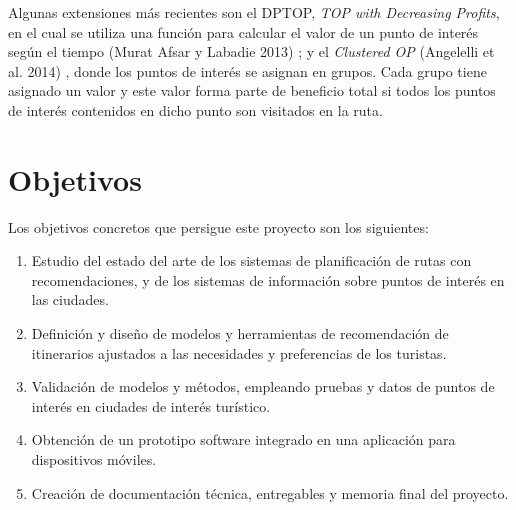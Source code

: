 Algunas extensiones más recientes son el DPTOP, \textit{TOP with Decreasing Profits}, en el cual se utiliza una función para calcular el valor de un punto de interés según el tiempo (Murat Afsar y Labadie 2013) \cite{dptop}; y el \textit{Clustered OP} (Angelelli et al. 2014) \cite{clustered_op}, donde los puntos de interés se asignan en grupos. Cada grupo tiene asignado un valor y este valor forma parte de beneficio total si todos los puntos de interés contenidos en dicho punto son visitados en la ruta.
\section[Objetivos]{Objetivos}
Los objetivos concretos que persigue este proyecto son los siguientes:
\begin{enumerate}
	\item Estudio del estado del arte de los sistemas de planificación de rutas con recomendaciones, y de los sistemas de información sobre puntos de interés en las ciudades.
	\item Definición y diseño de modelos y herramientas de recomendación de itinerarios ajustados a las necesidades y preferencias de los turistas.
	\item Validación de modelos y métodos, empleando pruebas y datos de puntos de interés en ciudades de interés turístico.
	\item Obtención de un prototipo software integrado en una aplicación para dispositivos móviles.
	\item Creación de documentación técnica, entregables y memoria final del proyecto.
\end{enumerate}
	
	

